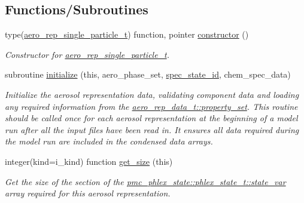 \subsection*{Functions/\+Subroutines}
\begin{DoxyCompactItemize}
\item 
type(\mbox{\hyperlink{structpmc__aero__rep__single__particle_1_1aero__rep__single__particle__t}{aero\+\_\+rep\+\_\+single\+\_\+particle\+\_\+t}}) function, pointer \mbox{\hyperlink{namespacepmc__aero__rep__single__particle_a610bc0a2fce99673f7e593667eff1b7e}{constructor}} ()
\begin{DoxyCompactList}\small\item\em Constructor for \mbox{\hyperlink{structpmc__aero__rep__single__particle_1_1aero__rep__single__particle__t}{aero\+\_\+rep\+\_\+single\+\_\+particle\+\_\+t}}. \end{DoxyCompactList}\item 
subroutine \mbox{\hyperlink{namespacepmc__aero__rep__single__particle_a68b301b8be296690e52b600ecaab5125}{initialize}} (this, aero\+\_\+phase\+\_\+set, \mbox{\hyperlink{interfacepmc__aero__rep__data_1_1spec__state__id}{spec\+\_\+state\+\_\+id}}, chem\+\_\+spec\+\_\+data)
\begin{DoxyCompactList}\small\item\em Initialize the aerosol representation data, validating component data and loading any required information from the {\ttfamily \mbox{\hyperlink{structpmc__aero__rep__data_1_1aero__rep__data__t_a87b1bf5cd10a0a2b51390fb24ebf56c5}{aero\+\_\+rep\+\_\+data\+\_\+t\+::property\+\_\+set}}}. This routine should be called once for each aerosol representation at the beginning of a model run after all the input files have been read in. It ensures all data required during the model run are included in the condensed data arrays. \end{DoxyCompactList}\item 
integer(kind=i\+\_\+kind) function \mbox{\hyperlink{namespacepmc__aero__rep__single__particle_a9f4a932c43b2ac0c227a2695be56837a}{get\+\_\+size}} (this)
\begin{DoxyCompactList}\small\item\em Get the size of the section of the {\ttfamily \mbox{\hyperlink{structpmc__phlex__state_1_1phlex__state__t_a78835cb552d483ebbfc7a6bc6f756918}{pmc\+\_\+phlex\+\_\+state\+::phlex\+\_\+state\+\_\+t\+::state\+\_\+var}}} array required for this aerosol representation. \end{DoxyCompactList}\item 

\end{DoxyCompactItemize}
